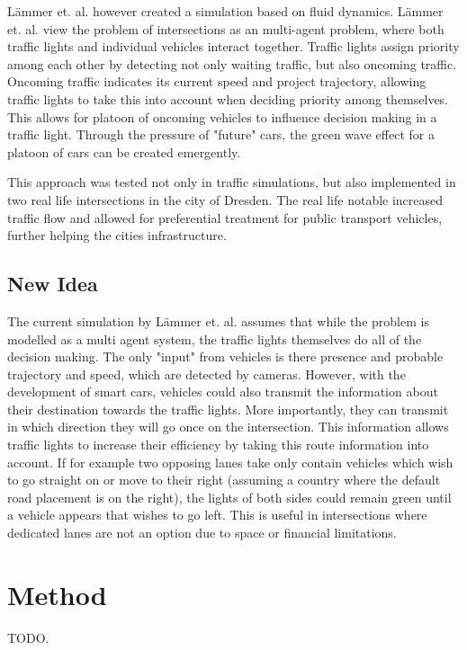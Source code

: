 \documentclass{article}
\begin{document}
L{\"a}mmer et. al. \cite{self_control2008} however created a simulation based on fluid dynamics.  L{\"a}mmer et. al. view the problem of intersections as an multi-agent problem, where both traffic lights and individual vehicles interact together. Traffic lights assign priority among each other by detecting not only waiting traffic, but also oncoming traffic. Oncoming traffic indicates its current speed and project trajectory, allowing traffic lights to take this into account when deciding priority among themselves. This allows for platoon of oncoming vehicles to influence decision making in a traffic light. Through the pressure of "future"  cars, the green wave effect for a platoon of cars can be created emergently.

This approach was tested not only in traffic simulations, but also implemented in two real life intersections in the city of Dresden. \cite{site} The real life notable increased traffic flow and allowed for preferential treatment for public transport vehicles, further helping the cities infrastructure.


\subsection{New Idea}

The current simulation by L{\"a}mmer et. al. assumes that while the problem is modelled as a multi agent system, the traffic lights themselves do all of the decision making. The only "input" from vehicles is there presence and probable trajectory and speed, which are detected by cameras. However, with the development of smart cars, vehicles could also transmit the information about their destination towards the traffic lights. More importantly, they can transmit in which direction they will go once on the intersection. This information allows traffic lights to increase their efficiency by taking this route information into account. If for example two opposing lanes take only contain vehicles which wish to go straight on or move to their right (assuming a country where the default road placement is on the right), the lights of both sides could remain green until a vehicle appears that wishes to go left. This is useful in intersections where dedicated lanes are not an option due to space or financial limitations. 



\section{Method}
TODO. %
\end{document}
